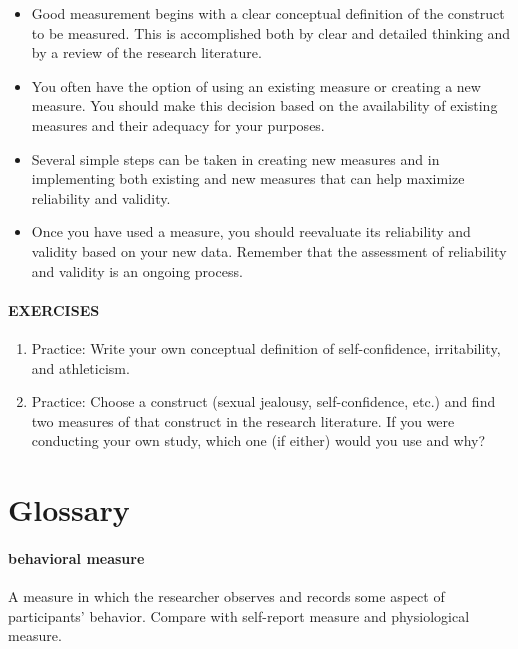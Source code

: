 \documentclass[
]{krantz}
\providecommand{\tightlist}{%
  \setlength{\itemsep}{0pt}\setlength{\parskip}{0pt}}
\begin{document}
\begin{itemize}
\tightlist
\item
  Good measurement begins with a clear conceptual definition of the construct to be measured. This is accomplished both by clear and detailed thinking and by a review of the research literature.
\item
  You often have the option of using an existing measure or creating a new measure. You should make this decision based on the availability of existing measures and their adequacy for your purposes.
\item
  Several simple steps can be taken in creating new measures and in implementing both existing and new measures that can help maximize reliability and validity.
\item
  Once you have used a measure, you should reevaluate its reliability and validity based on your new data. Remember that the assessment of reliability and validity is an ongoing process.
\end{itemize}

\paragraph*{EXERCISES}\label{exercises-10}

\begin{enumerate}
\def\labelenumi{\arabic{enumi}.}
\tightlist
\item
  Practice: Write your own conceptual definition of self-confidence, irritability, and athleticism.
\item
  Practice: Choose a construct (sexual jealousy, self-confidence, etc.) and find two measures of that construct in the research literature. If you were conducting your own study, which one (if either) would you use and why?
\end{enumerate}

\section{Glossary}\label{glossary-3}

\paragraph*{behavioral measure}\label{behavioral-measure}

A measure in which the researcher observes and records some aspect of participants' behavior. Compare with self-report measure and physiological measure.
\end{document}
